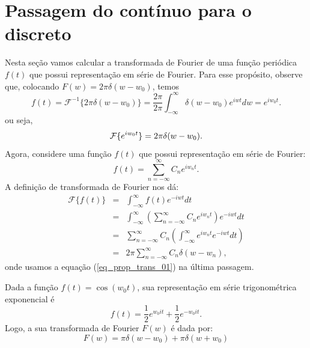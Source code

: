\section{Passagem do contínuo para o discreto}
Nesta seção vamos calcular a transformada de Fourier de uma função periódica $f(t)$ que possui representação em série de Fourier. Para esse propósito, observe que, colocando $F(w)=2\pi \delta(w-w_0)$, temos 
\begin{equation*}
f(t)=\mathcal{F}^{-1}\{2\pi\delta(w-w_0)\}=\frac{2\pi}{2\pi}\int_{-\infty}^\infty \delta(w-w_0)e^{iwt}dw=e^{iw_0t}.
\end{equation*}
ou seja,
\begin{equation}{\label{eq_prop_trans_01}}
\mathcal{F}\{e^{iw_0t}\}=2\pi\delta(w-w_0).
\end{equation}
Agora, considere uma função $f(t)$ que possui representação em série de Fourier:
\begin{equation}
f(t)=\sum_{n=-\infty}^\infty C_n e^{iw_nt}.
\end{equation}
A definição de transformada de Fourier nos dá:
\begin{eqnarray*}
\mathcal{F}\{f(t)\}&=&\int_{-\infty}^\infty f(t) e^{-iwt}dt\\
&=&\int_{-\infty}^\infty\left( \sum_{n=-\infty}^\infty C_n e^{iw_nt}\right) e^{-iwt}dt\\
&=& \sum_{n=-\infty}^\infty C_n \left(\int_{-\infty}^\infty e^{iw_nt}e^{-iwt} dt \right)\\
&=&2\pi \sum_{n=-\infty}^\infty C_n \delta(w-w_n) ,
\end{eqnarray*}
onde usamos a equação (\ref{eq_prop_trans_01}) na última passagem.
\begin{ex}{\label{ex_ant}} Dada a função $f(t)=\cos(w_0t)$, sua representação em série trigonométrica exponencial é
\begin{equation}
f(t)=\frac{1}{2}e^{w_0it}+\frac{1}{2}e^{-w_0it}.
\end{equation}
Logo, a sua transformada de Fourier $F(w)$ é dada por:
\begin{equation}
F(w)=\pi\delta(w-w_0)+\pi\delta(w+w_0)
\end{equation}
\end{ex}
